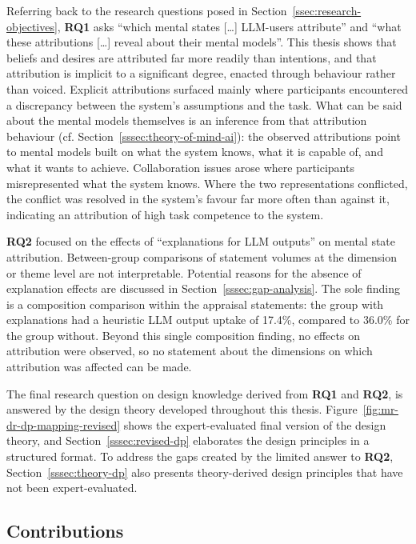 Referring back to the research questions posed in Section~\ref{ssec:research-objectives}, \textbf{RQ1} asks \enquote{which mental states [\ldots] \ac{LLM}-users attribute} and \enquote{what these attributions [\ldots] reveal about their mental models}. This thesis shows that beliefs and desires are attributed far more readily than intentions, and that attribution is implicit to a significant degree, enacted through behaviour rather than voiced. Explicit attributions surfaced mainly where participants encountered a discrepancy between the system's assumptions and the task. What can be said about the mental models themselves is an inference from that attribution behaviour (cf. Section~\ref{sssec:theory-of-mind-ai}): the observed attributions point to mental models built on what the system knows, what it is capable of, and what it wants to achieve. Collaboration issues arose where participants misrepresented what the system knows. Where the two representations conflicted, the conflict was resolved in the system's favour far more often than against it, indicating an attribution of high task competence to the system.

\textbf{RQ2} focused on the effects of \enquote{explanations for \ac{LLM} outputs} on mental state attribution. Between-group comparisons of statement volumes at the dimension or theme level are not interpretable. Potential reasons for the absence of explanation effects are discussed in Section~\ref{sssec:gap-analysis}. The sole finding is a composition comparison within the appraisal statements: the group with explanations had a heuristic \ac{LLM} output uptake of 17.4\%, compared to 36.0\% for the group without. Beyond this single composition finding, no effects on attribution were observed, so no statement about the dimensions on which attribution was affected can be made.

The final research question on design knowledge derived from \textbf{RQ1} and \textbf{RQ2}, is answered by the design theory developed throughout this thesis. Figure~\ref{fig:mr-dr-dp-mapping-revised} shows the expert-evaluated final version of the design theory, and Section~\ref{sssec:revised-dp} elaborates the design principles in a structured format. To address the gaps created by the limited answer to \textbf{RQ2}, Section~\ref{sssec:theory-dp} also presents theory-derived design principles that have not been expert-evaluated.

\subsection{Contributions} \label{ssec:contributions}


